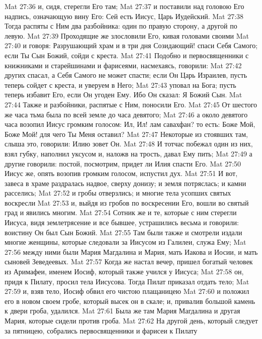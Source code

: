\vs Mat 27:36 и, сидя, стерегли Его там;
\vs Mat 27:37 и поставили над головою Его надпись, означающую вину Его: Сей есть Иисус, Царь Иудейский.
\vs Mat 27:38 Тогда распяты с Ним два разбойника: один по правую сторону, а другой по левую.
\vs Mat 27:39 Проходящие же злословили Его, кивая головами своими
\vs Mat 27:40 и говоря: Разрушающий храм и в три дня Созидающий! спаси Себя Самого; если Ты Сын Божий, сойди с креста.
\vs Mat 27:41 Подобно и первосвященники с книжниками и старейшинами и фарисеями, насмехаясь, говорили:
\vs Mat 27:42 других спасал, а Себя Самого не может спасти; если Он Царь Израилев, пусть теперь сойдет с креста, и уверуем в Него;
\vs Mat 27:43 уповал на Бога; пусть теперь избавит Его, если Он угоден Ему. Ибо Он сказал: Я Божий Сын.
\vs Mat 27:44 Также и разбойники, распятые с Ним, поносили Его.
\rsbpar\vs Mat 27:45 От шестого же часа тьма была по всей земле до часа девятого;
\vs Mat 27:46 а около девятого часа возопил Иисус громким голосом: Ил, Ил! лам савахфан? то есть: Боже Мой, Боже Мой! для чего Ты Меня оставил?
\vs Mat 27:47 Некоторые из стоявших там, слыша это, говорили: Илию зовет Он.
\vs Mat 27:48 И тотчас побежал один из них, взял губку, наполнил уксусом и, наложв на трость, давал Ему пить;
\vs Mat 27:49 а другие говорили: постой, посмотрим, придет ли Илия спасти Его.
\vs Mat 27:50 Иисус же, опять возопив громким голосом, испустил дух.
\vs Mat 27:51 И вот, завеса в храме раздралась надвое, сверху донизу; и земля потряслась; и камни расселись;
\vs Mat 27:52 и гробы отверзлись; и многие тела усопших святых воскресли
\vs Mat 27:53 и, выйдя из гробов по воскресении Его, вошли во святый град и явились многим.
\vs Mat 27:54 Сотник же и те, которые с ним стерегли Иисуса, видя землетрясение и все бывшее, устрашились весьма и говорили: воистину Он был Сын Божий.
\vs Mat 27:55 Там были также и смотрели издали многие женщины, которые следовали за Иисусом из Галилеи, служа Ему;
\vs Mat 27:56 между ними были Мария Магдалина и Мария, мать Иакова и Иосии, и мать сыновей Зеведеевых.
\rsbpar\vs Mat 27:57 Когда же настал вечер, пришел богатый человек из Аримафеи, именем Иосиф, который также учился у Иисуса;
\vs Mat 27:58 он, придя к Пилату, просил тела Иисусова. Тогда Пилат приказал отдать тело;
\vs Mat 27:59 и, взяв тело, Иосиф обвил его чистою плащаницею
\vs Mat 27:60 и положил его в новом своем гробе, который высек он в скале; и, привалив большой камень к двери гроба, удалился.
\vs Mat 27:61 Была же там Мария Магдалина и другая Мария, которые сидели против гроба.
\rsbpar\vs Mat 27:62 На другой день, который следует за пятницею, собрались первосвященники и фарисеи к Пилату
